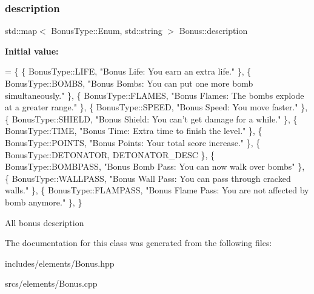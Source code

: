 \subsubsection{\texorpdfstring{description}{description}}
{\footnotesize\ttfamily std\+::map$<$ Bonus\+Type\+::\+Enum, std\+::string $>$ Bonus\+::description\hspace{0.3cm}{\ttfamily [static]}}

{\bfseries Initial value\+:}
\begin{DoxyCode}
= \{
    \{ BonusType::LIFE, \textcolor{stringliteral}{"Bonus Life: You earn an extra life."} \},
    \{ BonusType::BOMBS, \textcolor{stringliteral}{"Bonus Bombs: You can put one more bomb simultaneously."} \},
    \{ BonusType::FLAMES, \textcolor{stringliteral}{"Bonus Flames: The bombs explode at a greater range."} \},
    \{ BonusType::SPEED, \textcolor{stringliteral}{"Bonus Speed: You move faster."} \},
    \{ BonusType::SHIELD, \textcolor{stringliteral}{"Bonus Shield: You can't get damage for a while."} \},
    \{ BonusType::TIME, \textcolor{stringliteral}{"Bonus Time: Extra time to finish the level."} \},
    \{ BonusType::POINTS, \textcolor{stringliteral}{"Bonus Points: Your total score increase."} \},
    \{ BonusType::DETONATOR, DETONATOR\_DESC \},  
    \{ BonusType::BOMBPASS, \textcolor{stringliteral}{"Bonus Bomb Pass: You can now walk over bombs"} \},
    \{ BonusType::WALLPASS, \textcolor{stringliteral}{"Bonus Wall Pass: You can pass through cracked walls."} \},
    \{ BonusType::FLAMPASS, \textcolor{stringliteral}{"Bonus Flame Pass: You are not affected by bomb anymore."} \},
\}
\end{DoxyCode}
All bonus description 

The documentation for this class was generated from the following files\+:\begin{DoxyCompactItemize}
\item 
includes/elements/Bonus.\+hpp\item 
srcs/elements/Bonus.\+cpp\end{DoxyCompactItemize}

